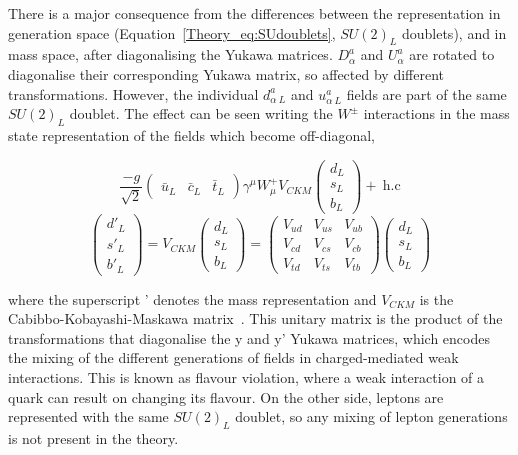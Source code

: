 There is a major consequence from the differences between the representation in generation space (Equation~\ref{Theory_eq:SUdoublets}, $SU(2)_L$ doublets), and in mass space, after diagonalising the Yukawa matrices. $D^a_{\alpha}$ and $U^a_{\alpha}$ are rotated to diagonalise their corresponding Yukawa matrix, so affected by different transformations. However, the individual $d^a_{\alpha\ L}$ and $u^a_{\alpha\ L}$ fields are part of the same $SU(2)_L$ doublet. The effect can be seen writing the $W^\pm$ interactions in the mass state representation of the fields which become off-diagonal,

\begin{equation}
    \frac{-g}{\sqrt{2}} \begin{pmatrix} \bar{u}_L & \bar{c}_L & \bar{t}_L \end{pmatrix} \gamma^\mu W_\mu^+ V_{CKM} \begin{pmatrix} d_L \\ s_L \\ b_L \end{pmatrix} +\ \text{h.c}
\end{equation}
\begin{equation}
\begin{pmatrix} d'_L \\ s'_L \\ b'_L \end{pmatrix} = V_{CKM}\begin{pmatrix} d_L \\ s_L \\ b_L \end{pmatrix} =\begin{pmatrix} V_{ud} & V_{us} & V_{ub} \\ V_{cd} & V_{cs} & V_{cb} \\ V_{td} & V_{ts} & V_{tb} \end{pmatrix} \begin{pmatrix} d_L \\ s_L \\ b_L \end{pmatrix}
\end{equation}

where the superscript ' denotes the mass representation and $V_{CKM}$ is the Cabibbo-Kobayashi-Maskawa matrix~\cite{Cabibbo,KobayaMaska}. This unitary matrix is the product of the transformations that diagonalise the y and y' Yukawa matrices, which encodes the mixing of the different generations of fields in charged-mediated weak interactions. This is known as flavour violation, where a weak interaction of a quark can result on changing its flavour. On the other side, leptons are represented with the same $SU(2)_L$ doublet, so any mixing of lepton generations is not present in the theory.


